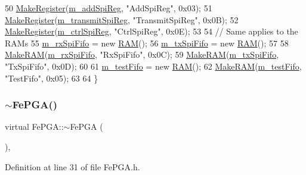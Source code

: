 \begin{DoxyCode}
50   \hyperlink{classFePGA_aa58fc0a09d8efa7abc2766bf5bb67327}{MakeRegister}(\hyperlink{classFePGA_a569eb8410924bec1c8279ca80dc37a6a}{m\_addSpiReg},      \textcolor{stringliteral}{"AddSpiReg"},      0x03);
51   \hyperlink{classFePGA_aa58fc0a09d8efa7abc2766bf5bb67327}{MakeRegister}(\hyperlink{classFePGA_a003ee241fb5f32fb3442174db3fe6f49}{m\_transmitSpiReg}, \textcolor{stringliteral}{"TransmitSpiReg"}, 0x0B);
52   \hyperlink{classFePGA_aa58fc0a09d8efa7abc2766bf5bb67327}{MakeRegister}(\hyperlink{classFePGA_a8fb76733a688dff6d91892a49a97a21f}{m\_ctrlSpiReg},     \textcolor{stringliteral}{"CtrlSpiReg"},     0x0E);
53 
54   \textcolor{comment}{// Same applies to the RAMs}
55   \hyperlink{classFePGA_a3ee7f973bfad39b48bbc1a185e9ffaec}{m\_rxSpiFifo}   = \textcolor{keyword}{new} \hyperlink{classRAM}{RAM}();
56   \hyperlink{classFePGA_a5b3e4deb73a882e6f044450d8a733558}{m\_txSpiFifo}   = \textcolor{keyword}{new} \hyperlink{classRAM}{RAM}();
57 
58   \hyperlink{classFePGA_ac3af50fbe7f8f7a8c6adbcb164cbbf47}{MakeRAM}(\hyperlink{classFePGA_a3ee7f973bfad39b48bbc1a185e9ffaec}{m\_rxSpiFifo}, \textcolor{stringliteral}{"RxSpiFifo"}, 0x0C);
59   \hyperlink{classFePGA_ac3af50fbe7f8f7a8c6adbcb164cbbf47}{MakeRAM}(\hyperlink{classFePGA_a5b3e4deb73a882e6f044450d8a733558}{m\_txSpiFifo}, \textcolor{stringliteral}{"TxSpiFifo"}, 0x0D);
60 
61   \hyperlink{classFePGA_a97fc9347c90d9a31d99ccb499cc06eee}{m\_testFifo}   = \textcolor{keyword}{new} \hyperlink{classRAM}{RAM}();
62   \hyperlink{classFePGA_ac3af50fbe7f8f7a8c6adbcb164cbbf47}{MakeRAM}(\hyperlink{classFePGA_a97fc9347c90d9a31d99ccb499cc06eee}{m\_testFifo}, \textcolor{stringliteral}{"TestFifo"}, 0x05);
63 
64 \}
\end{DoxyCode}
\mbox{\label{classFePGA_aa445095a44c521b6b7803feaef6c16ba}} 
\subsubsection{\texorpdfstring{$\sim$\+Fe\+P\+G\+A()}{~FePGA()}}
{\footnotesize\ttfamily virtual Fe\+P\+G\+A\+::$\sim$\+Fe\+P\+GA (\begin{DoxyParamCaption}{ }\end{DoxyParamCaption})\hspace{0.3cm}{\ttfamily [inline]}, {\ttfamily [virtual]}}



Definition at line 31 of file Fe\+P\+G\+A.\+h.


